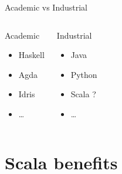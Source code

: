 \documentclass[aspectratio=169]{beamer}
\begin{document}
\begin{frame}{Academic vs Industrial}
  \begin{columns}
    \begin{block}{Academic}
      \begin{itemize}
        \item Haskell
        \item Agda
        \item Idris
        \item \ldots
      \end{itemize}
    \end{block}
    \begin{block}{Industrial}
      \begin{itemize}
        \item Java
        \item Python
        \item \alert{Scala} ?
        \item \ldots
      \end{itemize}
    \end{block}
  \end{columns}
\end{frame}

\section{Scala benefits}
\end{document}
